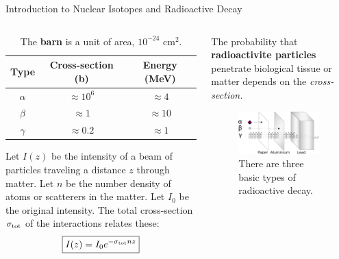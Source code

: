 \documentclass{beamer}
\begin{document}
\begin{frame}{Introduction to Nuclear Isotopes and Radioactive Decay}
\begin{columns}[T]
\begin{column}{0.6\textwidth}
\footnotesize
\begin{table}
\centering
\begin{tabular}{| c | c | c |}
\hline
Type & Cross-section (b) & Energy (MeV) \\ \hline
$\alpha$ & $\approx 10^6$ & $\approx 4$ \\ \hline
$\beta$ & $\approx 1$ & $\approx 10$ \\ \hline
$\gamma$ & $\approx 0.2$ & $\approx 1$ \\ \hline
\end{tabular}
\caption{\label{tab:radio2} The \textbf{barn} is a unit of area, $10^{-24}$ cm$^2$.}
\end{table}
Let $I(z)$ be the intensity of a beam of particles traveling a distance $z$ through matter.  Let $n$ be the number density of atoms or scatterers in the matter.  Let $I_0$ be the original intensity.  The total cross-section $\sigma_{\rm tot}$ of the interactions relates these:
\begin{equation}
\boxed{I(z) = I_0 e^{-\sigma_{\rm tot} n z}}
\end{equation}
\end{column}
\begin{column}{0.4\textwidth}
\footnotesize
The probability that \textbf{\alert{radioactivite particles}} penetrate biological tissue or matter depends on the \textit{cross-section.}
\begin{figure}
\centering
\includegraphics[width=0.95\textwidth]{figures/radioactivity.png}
\caption{\label{fig:radio7} There are three basic types of radioactive decay.}
\end{figure}
\end{column}
\end{columns}
\end{frame}
\end{document}
